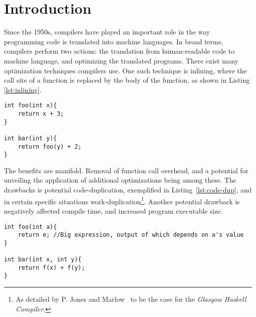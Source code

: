 
\section{Introduction}
\label{introduction}

Since the 1950s, compilers have played an important role in the way programming
code is translated into machine languages. In broad terms, compilers perform two
actions: the translation from human-readable code to machine language, and
optimizing the translated programs. There exist many optimization techniques
compilers use. One such technique is inlining, where the call site of a function
is replaced by the body of the function, as shown in Listing \ref{lst:inlining}.

\begin{lstlisting}[label={lst:inlining}, style=customcpp,
caption={Function \textit{foo()} inlined into function \textit{bar()} would
result in the body of \textit{bar()} being \textit{return x + 3 + 2}, in which
case the optimization technique of constant folding is unveiled, permitting the
compiler to replace the expression with its cheaper equivalent: \textit{x +
5}.}]
int foo(int x){
	return x + 3;
}

int bar(int y){
	return foo(y) + 2;
}
\end{lstlisting}
\vspace{-4\parskip} %

The benefits are manifold. Removal of function call overhead, and a potential
for unveiling the application of additional optimizations being among these. The
drawbacks is potential code-duplication, exemplified in Listing~\ref{lst:code-dup},
and in certain specific situations work-duplication\footnote{As detailed by P.
Jones and Marlow~\cite{GHCPaper} to be the case for the \textit{Glasgow Haskell
Compiler}.}. Another potential drawback is negatively affected compile time, and
increased program executable size.

\begin{lstlisting}[label={lst:code-dup}, style=customcpp,
caption={Code duplication in \textit{bar()}, when inlining \textit{foo()} into
\textit{bar()}. The big expression \textit{e} in \textit{foo()}, would be
duplicated when inlined into \textit{bar()}. This replaces the cost of function
call overhead with the increased size of the final program, unless potential
optimizations that counteract this are unveiled when inlining \textit{foo()}.}]
int foo(int a){
	return e; //Big expression, output of which depends on a's value
}

int bar(int x, int y){
	return f(x) + f(y);
}
\end{lstlisting}
\vspace{-4\parskip} %

